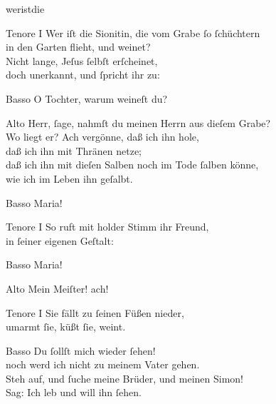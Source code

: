 \documentclass[tocstyle=ref-genre]{ees}
\begin{document}
{\begin{movement}{weristdie}
  \item[Tenore I]
  Wer iſt die Sionitin, die vom Grabe ſo ſchüchtern\\
  in den Garten flieht, und weinet?\\
  Nicht lange, Jeſus ſelbſt erſcheinet,\\
  doch unerkannt, und ſpricht ihr zu:

  \item[Basso]
  O Tochter, warum weineſt du?

  \item[Alto]
  Herr, ſage, nahmſt du meinen Herrn aus dieſem Grabe?\\
  Wo liegt er? Ach vergönne, daß ich ihn hole,\\
  daß ich ihn mit Thränen netze;\\
  daß ich ihn mit dieſen Salben noch im Tode ſalben könne,\\
  wie ich im Leben ihn geſalbt.

  \item[Basso]
  Maria!

  \item[Tenore I]
  So ruft mit holder Stimm ihr Freund,\\
  in ſeiner eigenen Geſtalt:

  \item[Basso]
  Maria!

  \item[Alto]
  Mein Meiſter! ach!

  \item[Tenore I]
  Sie fällt zu ſeinen Füßen nieder,\\
  umarmt ſie, küßt ſie, weint.

  \item[Basso]
  Du ſollſt mich wieder ſehen!\\
  noch werd ich nicht zu meinem Vater gehen.\\
  Steh auf, und ſuche meine Brüder, und meinen Simon!\\
  Sag: Ich leb und will ihn ſehen.
\end{movement}

}
\end{document}
